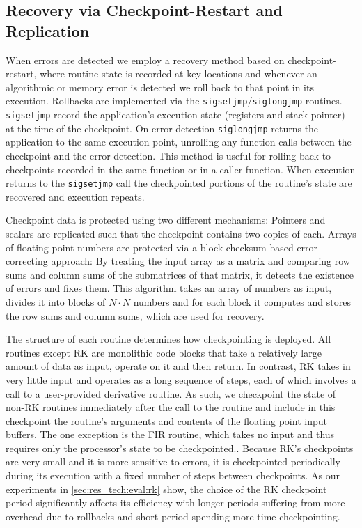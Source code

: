 \documentclass{sig-alternate}
\begin{document}
\subsection{Recovery via Checkpoint-Restart and Replication}
\label{sec:res_tech:cr}

When errors are detected we employ a recovery method based on checkpoint-restart, where routine state is recorded at key locations and whenever an algorithmic or memory error is detected we roll back to that point in its execution.
Rollbacks are implemented via the \texttt{sigsetjmp}/\texttt{siglongjmp} \cite{sigsetjmp:1997} routines.
\texttt{sigsetjmp} record the application's execution state (registers and stack pointer) at the time of the checkpoint.
On error detection \texttt{siglongjmp} returns the application to the same execution point, unrolling any function calls between the checkpoint and the error detection.
This method is useful for rolling back to checkpoints recorded in the same function or in a caller function.
When execution returns to the \texttt{sigsetjmp} call the checkpointed portions of the routine's state are recovered and execution repeats.

Checkpoint data is protected using two different mechanisms:
Pointers and scalars are replicated such that the checkpoint contains two copies of each.
Arrays of floating point numbers are protected via a block-checksum-based error correcting approach:
By treating the input array as a matrix and comparing row sums and column sums of the submatrices of that matrix, it detects the existence of errors and fixes them. 
This algorithm takes an array of numbers as input, divides it into blocks of $N \cdot N$ numbers and for each block it computes and stores the row sums and column sums, which are used for recovery.

The structure of each routine determines how checkpointing is deployed.
All routines except RK are monolithic code blocks that take a relatively large amount of data as input, operate on it and then return.
In contrast, RK takes in very little input and operates as a long sequence of steps, each of which involves a call to a user-provided derivative routine.
As such, we checkpoint the state of non-RK routines immediately after the call to the routine and include in this checkpoint the routine's arguments and contents of the floating point input buffers.
The one exception is the FIR routine, which takes no input and thus requires only the processor's state to be checkpointed..
Because RK's checkpoints are very small and it is more sensitive to errors, it is checkpointed periodically during its execution with a fixed number of steps between checkpoints.
As our experiments in \ref{sec:res_tech:eval:rk} show, the choice of the RK checkpoint period significantly affects its efficiency with longer periods suffering from more overhead due to rollbacks and short period spending more time checkpointing.
\end{document}
